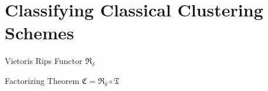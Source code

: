 \chapter{Classifying Classical Clustering Schemes}

\begin{definition}{Vietoris Rips Functor}{}
$\mathfrak{R_\delta}$
\end{definition}

\begin{theorem}{Factorizing Theorem}{}
$\mathfrak{C} = \mathfrak{R_\delta} \circ \mathfrak{T}$
\end{theorem}
